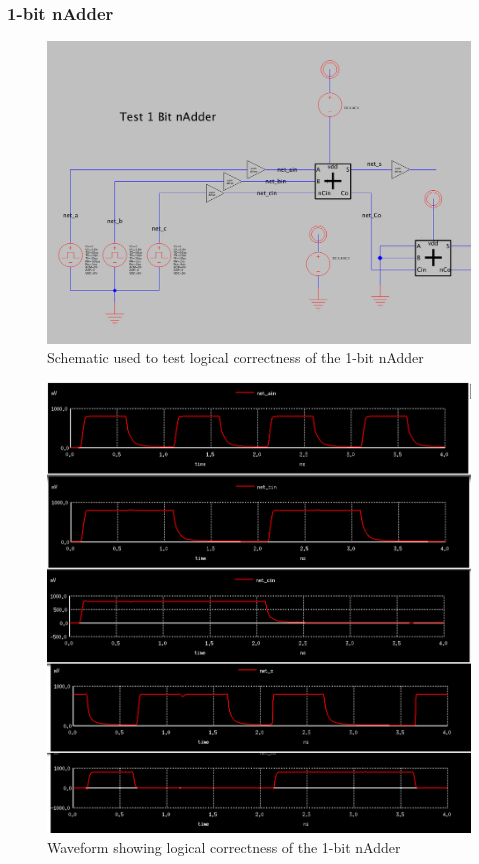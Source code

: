 \documentclass{article}
\begin{document}
\subsubsection{1-bit nAdder}
\begin{figure}[H]
  \includegraphics[width=\linewidth]{opt_screenshots/test_logic_1b_nadder_sch.png}
  \caption{Schematic used to test logical correctness of the 1-bit nAdder}
  \label{fig:test_logic_1b_nadder_sch}
\end{figure}

\begin{figure}[H]
  \includegraphics[width=\linewidth]{opt_screenshots/test_logic_1b_nadder.png}
  \caption{Waveform showing logical correctness of the 1-bit nAdder}
  \label{fig:test_logic_1b_nadder}
\end{figure}
\end{document}
